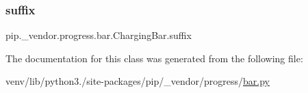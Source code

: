 \subsubsection{\texorpdfstring{suffix}{suffix}}
{\footnotesize\ttfamily pip.\+\_\+vendor.\+progress.\+bar.\+Charging\+Bar.\+suffix\hspace{0.3cm}{\ttfamily [static]}}



The documentation for this class was generated from the following file\+:\begin{DoxyCompactItemize}
\item 
venv/lib/python3./site-\/packages/pip/\+\_\+vendor/progress/\hyperlink{bar_8py}{bar.\+py}\end{DoxyCompactItemize}
